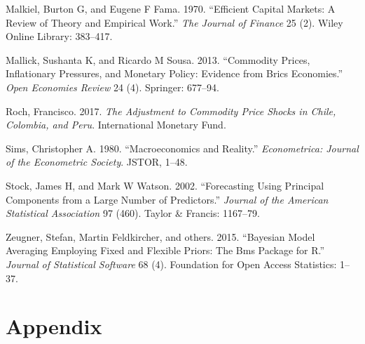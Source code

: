 \documentclass[12pt,]{article}
\begin{document}
\hypertarget{ref-malkiel1970efficient}{}
Malkiel, Burton G, and Eugene F Fama. 1970. ``Efficient Capital Markets:
A Review of Theory and Empirical Work.'' \emph{The Journal of Finance}
25 (2). Wiley Online Library: 383--417.

\hypertarget{ref-mallick2013commodity}{}
Mallick, Sushanta K, and Ricardo M Sousa. 2013. ``Commodity Prices,
Inflationary Pressures, and Monetary Policy: Evidence from Brics
Economies.'' \emph{Open Economies Review} 24 (4). Springer: 677--94.

\hypertarget{ref-roch2017adjustment}{}
Roch, Francisco. 2017. \emph{The Adjustment to Commodity Price Shocks in
Chile, Colombia, and Peru}. International Monetary Fund.

\hypertarget{ref-sims1980macroeconomics}{}
Sims, Christopher A. 1980. ``Macroeconomics and Reality.''
\emph{Econometrica: Journal of the Econometric Society}. JSTOR, 1--48.

\hypertarget{ref-stock2002forecasting}{}
Stock, James H, and Mark W Watson. 2002. ``Forecasting Using Principal
Components from a Large Number of Predictors.'' \emph{Journal of the
American Statistical Association} 97 (460). Taylor \& Francis: 1167--79.

\hypertarget{ref-zeugner2015bayesian}{}
Zeugner, Stefan, Martin Feldkircher, and others. 2015. ``Bayesian Model
Averaging Employing Fixed and Flexible Priors: The Bms Package for R.''
\emph{Journal of Statistical Software} 68 (4). Foundation for Open
Access Statistics: 1--37.

\section{Appendix}\label{appendix}
\end{document}
